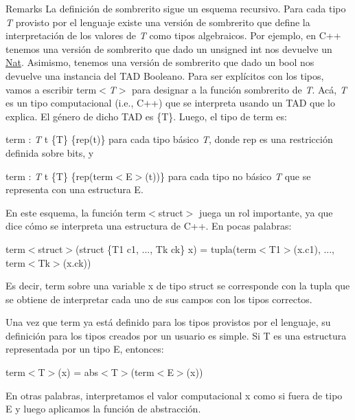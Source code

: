 \begin{DoxyRemark}{\-Remarks}
\-La definición de sombrerito sigue un esquema recursivo. \-Para cada tipo {\itshape \-T\/} provisto por el lenguaje existe una versión de sombrerito que define la interpretación de los valores de {\itshape \-T\/} como tipos algebraicos. \-Por ejemplo, en \-C++ tenemos una versión de sombrerito que dado un unsigned int nos devuelve un \hyperlink{classNat}{\-Nat}. \-Asimismo, tenemos una versión de sombrerito que dado un bool nos devuelve una instancia del \-T\-A\-D \-Booleano. \-Para ser explícitos con los tipos, vamos a escribir term$<${\itshape \-T$>$\/} para designar a la función sombrerito de {\itshape \-T\/}. \-Acá, {\itshape \-T\/} es un tipo computacional (i.\-e., \-C++) que se interpreta usando un \-T\-A\-D que lo explica. \-El género de dicho \-T\-A\-D es \{\-T\}. \-Luego, el tipo de term es\-:
\begin{DoxyEnumerate}
\item term \-: {\itshape \-T\/} t  \{\-T\} \{rep(t)\} para cada tipo básico {\itshape \-T\/}, donde rep es una restricción definida sobre bits, y
\item term \-: {\itshape \-T\/} t  \{\-T\} \{rep(term$<$\-E$>$(t))\} para cada tipo no básico {\itshape \-T\/} que se representa con una estructura \-E.
\end{DoxyEnumerate}
\end{DoxyRemark}
\-En este esquema, la función term$<$struct$>$ juega un rol importante, ya que dice cómo se interpreta una estructura de \-C++. \-En pocas palabras\-:
\begin{DoxyItemize}
\item term$<$struct$>$(struct \{\-T1 c1, ..., \-Tk ck\} x) = tupla(term$<$\-T1$>$(x.\-c1), ..., term$<$\-Tk$>$(x.\-ck))
\end{DoxyItemize}

\-Es decir, term sobre una variable x de tipo struct se corresponde con la tupla que se obtiene de interpretar cada uno de sus campos con los tipos correctos.

\-Una vez que term ya está definido para los tipos provistos por el lenguaje, su definición para los tipos creados por un usuario es simple. \-Si \-T es una estructura representada por un tipo \-E, entonces\-:
\begin{DoxyItemize}
\item term$<$\-T$>$(x) = abs$<$\-T$>$(term$<$\-E$>$(x))
\end{DoxyItemize}

\-En otras palabras, interpretamos el valor computacional x como si fuera de tipo \-E y luego aplicamos la función de abstracción. 

